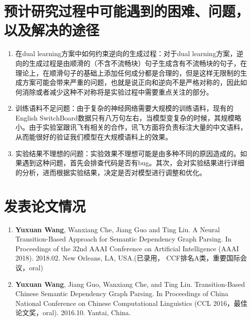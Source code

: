 \section{预计研究过程中可能遇到的困难、问题，以及解决的途径}

\begin{enumerate}
	\item 在dual learning方案中如何约束逆向的生成过程：对于dual learning方案，逆向的生成过程是由顺滑的（不含不流畅块）句子生成含有不流畅块的句子，在理论上，在顺滑句子的基础上添加任何成分都是合理的，但是这样无限制的生成方案可能会带来严重的问题，也就是说正向和逆向不是严格对称的，因此如何消除或者减少这种不对称将是实验过程中需要重点关注的部分。
	\item 训练语料不足问题：由于复杂的神经网络需要大规模的训练语料，现有的English SwitchBoard数据只有八万句左右，当模型变复杂的时候，其规模略小。由于实验室跟讯飞有相关的合作，讯飞方面将负责标注大量的中文语料，从而能很好的验证我们模型在大规模语料上的效果。
	\item 实验结果不理想的问题：实验效果不理想可能是由多种不同的原因造成的。如果遇到这种问题，首先会排查代码是否有bug。其次，会对实验结果进行详细的分析，进而根据实验结果，决定是否对模型进行调整和优化。
\end{enumerate}

\section{发表论文情况}
\begin{enumerate}
	\item \textbf{Yuxuan Wang}, Wanxiang Che, Jiang Guo and Ting Liu. A Neural Transition-Based Approach for Semantic Dependency Graph Parsing. In Proceedings of the 32nd AAAI Conference on Artificial Intelligence (AAAI 2018). 2018.02. New Orleans, LA, USA.(已录用， CCF排名A类，重要国际会议，oral)
	\item \textbf{Yuxuan Wang}, Jiang Guo,  Wanxiang Che, and Ting Liu. Transition-Based Chinese Semantic Dependency Graph Parsing. In Proceedings of China National Conference on Chinese Computational Linguistics (CCL 2016，最佳论文奖，oral). 2016.10. Yantai, China.
\end{enumerate}

\clearpage

\newpage